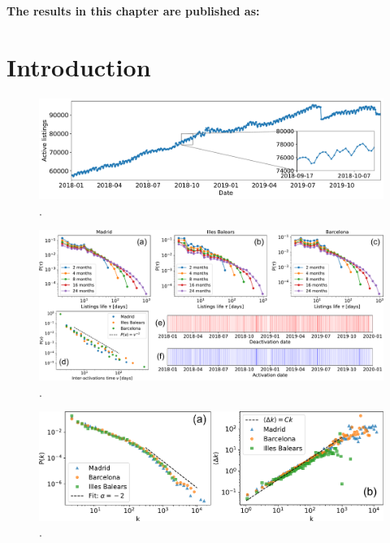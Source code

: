 \vspace{-1.5cm}
\small
\textbf{The results in this chapter are published as:}
\vspace{0.05 cm}

\normalsize
\vspace{0.5 cm}

\section{Introduction}

\begin{figure}
    \label{fig:active_adds}
    \centering
    \includegraphics[width =\textwidth]{Figs/Idealista_dynamics/active_adds.pdf}
	\caption[.]{ . }
\end{figure}

\begin{figure}
    \label{fig:panel_time}
    \centering
    \includegraphics[width =\textwidth]{Figs/Idealista_dynamics/panel_time.pdf}
	\caption[.]{ . }
\end{figure}

\begin{figure}
    \label{fig:panel_degree}
    \centering
    \includegraphics[width =\textwidth]{Figs/Idealista_dynamics/panel_degree.pdf}
	\caption[.]{ . }
\end{figure}





